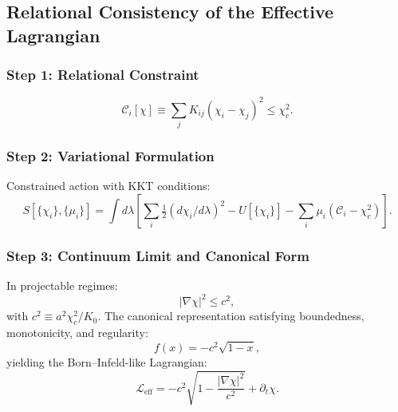 \subsection{Relational Consistency of the Effective Lagrangian}
\label{sec:born-lagrangian_derivation}

\subsubsection*{Step 1: Relational Constraint}
\label{subsec:A12-relational-constraint_v171}

\begin{equation}
  \mathcal{C}_i[\chi]
  \equiv
  \sum_j K_{ij}(\chi_i - \chi_j)^2
  \le \chi_c^2.
  \label{eq:A12-relational-constraint_v171}
\end{equation}

\subsubsection*{Step 2: Variational Formulation}
\label{subsec:A12-variational-structure_v171}

Constrained action with KKT conditions:
\begin{equation}
  S[\{\chi_i\},\{\mu_i\}]
  = \int d\lambda
    \left[
      \sum_i \tfrac{1}{2}
        (d\chi_i/d\lambda)^2
      - U[\{\chi_i\}]
      - \sum_i \mu_i
        (\mathcal{C}_i - \chi_c^2)
    \right].
  \label{eq:A12-action_v171}
\end{equation}

\subsubsection*{Step 3: Continuum Limit and Canonical Form}
\label{subsec:A12-continuum-limit_v171}

In projectable regimes:
\begin{equation}
  |\nabla\chi|^2 \le c^2,
  \label{eq:A12-continuum-bound_v171}
\end{equation}
with $c^2 \equiv a^2\chi_c^2/K_0$.
The canonical representation satisfying boundedness, monotonicity, and
regularity:
\begin{equation}
  f(x) = -c^2\sqrt{1 - x},
  \label{eq:A12-born-infeld-derivation_v171}
\end{equation}
yielding the Born--Infeld-like Lagrangian:
\begin{equation}
  \mathcal{L}_{\text{eff}}
  = -c^2\sqrt{
      1 - \frac{|\nabla\chi|^2}{c^2}
    }
    + \partial_t\chi.
  \label{eq:A12-effective-lagrangian_v171}
\end{equation}


